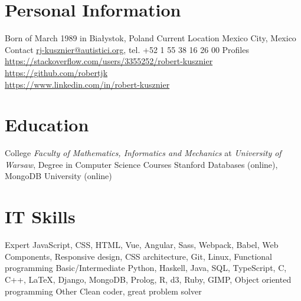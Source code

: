 

\section{Personal Information}

\begin{sectionlist}
    \sectionlistitem
        {Born}
        { of March 1989 in Bia\l{}ystok, Poland}
    \sectionlistitem
        {Current Location}
        {Mexico City, Mexico}
    \sectionlistitem
        {Contact}
        {
            \href{mailto:rj-kusznier@autistici.org}{rj-kusznier@autistici.org},
            tel. +52 1 55 38 16 26 00
        }
    \sectionlistitem
        {Profiles}
        {
            \url{https://stackoverflow.com/users/3355252/robert-kusznier} \\
            \url{https://github.com/robertjk} \\
            \url{https://www.linkedin.com/in/robert-kusznier}
        }
\end{sectionlist}


\section{Education}

\begin{sectionlist}
    \sectionlistitem
        {College}
        {
            \emph{Faculty of Mathematics, Informatics and Mechanics} at
            \emph{University of Warsaw}, Degree in Computer
            Science
        }
    \sectionlistitem
        {Courses}
        {Stanford Databases (online), MongoDB University (online)}
\end{sectionlist}


\section{IT Skills}

\begin{sectionlist}
    \sectionlistitem
        {Expert}
        {
            JavaScript, CSS, HTML, Vue, Angular, Sass, Webpack, Babel, Web
            Components, Responsive design, CSS architecture, Git, Linux,
            Functional programming
        }
    \sectionlistitem
        {Basic/Intermediate}
        {
            Python, Haskell, Java, SQL, TypeScript, C, C++, \LaTeX, Django,
            MongoDB, Prolog, R, d3, Ruby, GIMP, Object oriented programming
        }
    \sectionlistitem
        {Other}
        {Clean coder, great problem solver}
\end{sectionlist}


